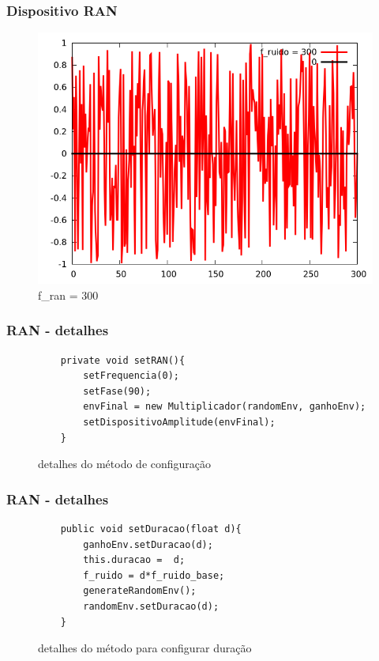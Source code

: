 \documentclass{beamer}
\begin{document}
\begin{frame}
 \frametitle{Dispositivo RAN}
 \begin{figure}
  \includegraphics[scale=0.2]{./images/f_ran_300.png}
  \caption{f\_ran = 300}
   \end{figure}
\end{frame}

 \begin{frame}[fragile]
 \frametitle{RAN - detalhes}
 \begin{figure}
 	\begin{lstlisting}
	private void setRAN(){
		setFrequencia(0);
		setFase(90);
		envFinal = new Multiplicador(randomEnv, ganhoEnv);
		setDispositivoAmplitude(envFinal);
	}
    			\end{lstlisting}
    			
    			\caption{detalhes do método de configuração}
	\end{figure}
\end{frame}

 \begin{frame}[fragile]
 \frametitle{RAN - detalhes}
 \begin{figure}
 	\centering
 	\begin{lstlisting}
	public void setDuracao(float d){
		ganhoEnv.setDuracao(d);
		this.duracao =  d;
		f_ruido = d*f_ruido_base;
		generateRandomEnv();
		randomEnv.setDuracao(d);
	}
    			\end{lstlisting}
	\caption{detalhes do método para configurar duração}	
	\end{figure}
\end{frame}
\end{document}
